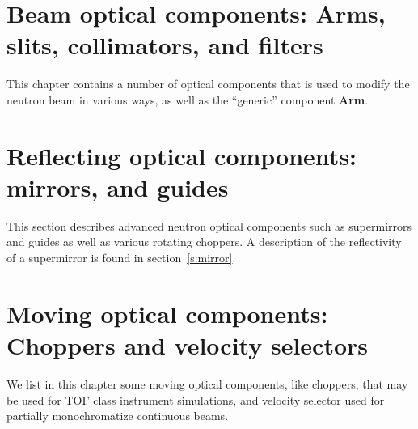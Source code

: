 
\chapter{Beam optical components:
Arms, slits, collimators, and filters}
This chapter contains a number of optical components
that is used to modify the neutron beam in various ways,
as well as the ``generic'' component {\bf Arm}.









\newpage




\newpage
\chapter{Reflecting optical components: mirrors, and guides}

This section describes advanced neutron optical
components such as supermirrors and guides as well as various rotating choppers.
A description of the reflectivity of a supermirror is found
in section~\ref{s:mirror}.



\chapter{Moving optical components:
Choppers and velocity selectors}
We list in this chapter some moving optical components,
like choppers, that may be used for TOF class instrument simulations,
and velocity selector used for partially monochromatize continuous beams.



\newpage




\newpage



\newpage

